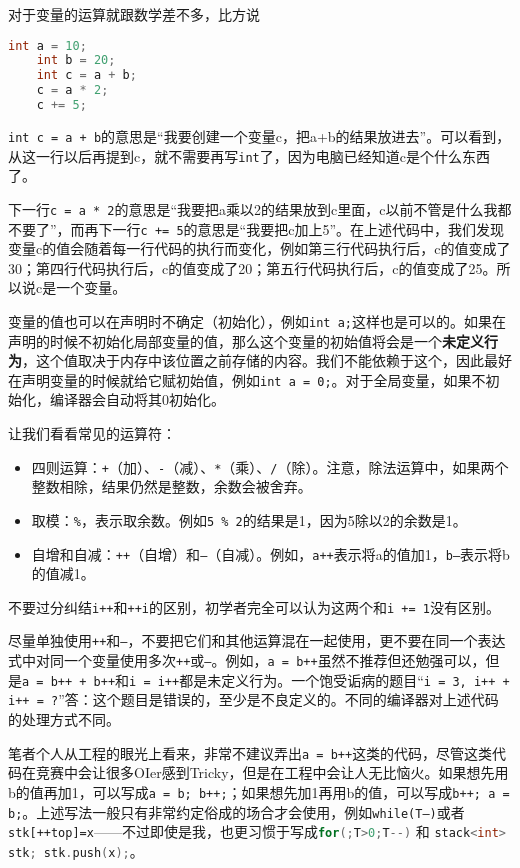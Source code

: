 对于变量的运算就跟数学差不多，比方说
\begin{lstlisting}[language=C++]
    int a = 10;
    int b = 20;
    int c = a + b;
    c = a * 2;
    c += 5;
\end{lstlisting}
\texttt{int c = a + b}的意思是“我要创建一个变量c，把a+b的结果放进去”。可以看到，从这一行以后再提到c，就不需要再写\texttt{int}了，因为电脑已经知道c是个什么东西了。

下一行\texttt{c = a * 2}的意思是“我要把a乘以2的结果放到c里面，c以前不管是什么我都不要了”，而再下一行\texttt{c += 5}的意思是“我要把c加上5”。在上述代码中，我们发现变量c的值会随着每一行代码的执行而变化，例如第三行代码执行后，c的值变成了30；第四行代码执行后，c的值变成了20；第五行代码执行后，c的值变成了25。所以说c是一个变量。

变量的值也可以在声明时不确定（初始化），例如\texttt{int a;}这样也是可以的。如果在声明的时候不初始化局部变量的值，那么这个变量的初始值将会是一个\textbf{未定义行为}，这个值取决于内存中该位置之前存储的内容。我们不能依赖于这个，因此最好在声明变量的时候就给它赋初始值，例如\texttt{int a = 0;}。对于全局变量，如果不初始化，编译器会自动将其0初始化。

让我们看看常见的运算符：
\begin{itemize}
  \item 四则运算：\texttt{+}（加）、\texttt{-}（减）、\texttt{*}（乘）、\texttt{/}（除）。注意，除法运算中，如果两个整数相除，结果仍然是整数，余数会被舍弃。
  \item 取模：\texttt{\%}，表示取余数。例如\texttt{5 \% 2}的结果是1，因为5除以2的余数是1。
  \item 自增和自减：\texttt{++}（自增）和\texttt{--}（自减）。例如，\texttt{a++}表示将a的值加1，\texttt{b--}表示将b的值减1。
\end{itemize}
不要过分纠结\texttt{i++}和\texttt{++i}的区别，初学者完全可以认为这两个和\texttt{i += 1}没有区别。

\begin{caution}
  尽量单独使用\texttt{++}和\texttt{--}，不要把它们和其他运算混在一起使用，更不要在同一个表达式中对同一个变量使用多次\texttt{++}或\texttt{--}。例如，\texttt{a = b++}虽然不推荐但还勉强可以，但是\texttt{a = b++ + b++}和\texttt{i = i++}都是未定义行为。一个饱受诟病的题目“\texttt{i = 3, i++ + i++ = ?}”答：这个题目是错误的，至少是不良定义的。不同的编译器对上述代码的处理方式不同。

  笔者个人从工程的眼光上看来，非常不建议弄出\texttt{a = b++}这类的代码，尽管这类代码在竞赛中会让很多OIer感到Tricky，但是在工程中会让人无比恼火。如果想先用b的值再加1，可以写成\texttt{a = b; b++;}；如果想先加1再用b的值，可以写成\texttt{b++; a = b;}。上述写法一般只有非常约定俗成的场合才会使用，例如\texttt{while(T--)}或者\texttt{stk[++top]=x}——不过即使是我，也更习惯于写成\lstinline[language=C++]|for(;T>0;T--)| 和 \lstinline[language=C++]|stack<int> stk; stk.push(x);|。
\end{caution}

